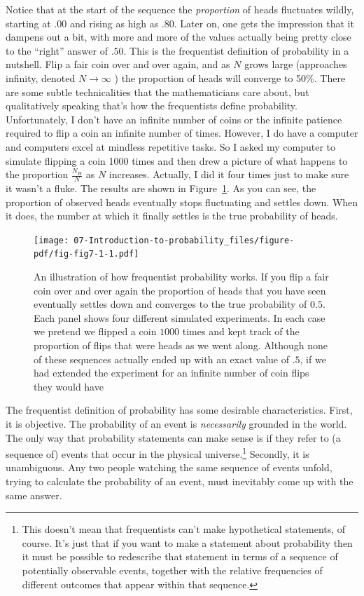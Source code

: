 \documentclass[
  a4paper,
]{book}
\begin{document}
Notice that at the start of the sequence the \emph{proportion} of heads
fluctuates wildly, starting at \(.00\) and rising as high as \(.80\).
Later on, one gets the impression that it dampens out a bit, with more
and more of the values actually being pretty close to the ``right''
answer of \(.50\). This is the frequentist definition of probability in
a nutshell. Flip a fair coin over and over again, and as \(N\) grows
large (approaches infinity, denoted \(N \rightarrow \infty\) ) the
proportion of heads will converge to 50\%. There are some subtle
technicalities that the mathematicians care about, but qualitatively
speaking that's how the frequentists define probability. Unfortunately,
I don't have an infinite number of coins or the infinite patience
required to flip a coin an infinite number of times. However, I do have
a computer and computers excel at mindless repetitive tasks. So I asked
my computer to simulate flipping a coin 1000 times and then drew a
picture of what happens to the proportion \(\frac{N_H}{N}\) as \(N\)
increases. Actually, I did it four times just to make sure it wasn't a
fluke. The results are shown in Figure~\ref{fig-fig7-1}. As you can see,
the proportion of observed heads eventually stops fluctuating and
settles down. When it does, the number at which it finally settles is
the true probability of heads.

\begin{figure}

\texttt{[image: 07-Introduction-to-probability\_files/figure-pdf/fig-fig7-1-1.pdf]} \hfill{}

\caption{\label{fig-fig7-1}An illustration of how frequentist
probability works. If you flip a fair coin over and over again the
proportion of heads that you have seen eventually settles down and
converges to the true probability of \(0.5\). Each panel shows four
different simulated experiments. In each case we pretend we flipped a
coin \(1000\) times and kept track of the proportion of flips that were
heads as we went along. Although none of these sequences actually ended
up with an exact value of \(.5\), if we had extended the experiment for
an infinite number of coin flips they would have}

\end{figure}

The frequentist definition of probability has some desirable
characteristics. First, it is objective. The probability of an event is
\emph{necessarily} grounded in the world. The only way that probability
statements can make sense is if they refer to (a sequence of) events
that occur in the physical universe.\footnote{This doesn't mean that
  frequentists can't make hypothetical statements, of course. It's just
  that if you want to make a statement about probability then it must be
  possible to redescribe that statement in terms of a sequence of
  potentially observable events, together with the relative frequencies
  of different outcomes that appear within that sequence.} Secondly, it
is unambiguous. Any two people watching the same sequence of events
unfold, trying to calculate the probability of an event, must inevitably
come up with the same answer.
\end{document}
